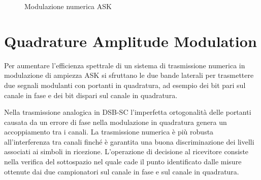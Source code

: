 \begin{figure}[ht]
{	\label{fig:ASK_modulazione}
	}\quad{}
\caption{Modulazione numerica \acf{ASK}}
\end{figure}

\section{Quadrature Amplitude Modulation}
Per aumentare l'efficienza spettrale di un sistema di trasmissione numerica in modulazione di ampiezza \ac{ASK} si sfruttano le due bande laterali per trasmettere due segnali modulanti con portanti in quadratura, ad esempio dei bit pari sul canale in fase e dei bit dispari sul canale in quadratura.

Nella trasmissione analogica in \ac{DSB-SC} l'imperfetta ortogonalità delle portanti causata da un errore di fase nella modulazione in quadratura genera un accoppiamento tra i canali. La trasmissione numerica è più robusta all'interferenza tra canali finché è garantita una buona discriminazione dei livelli associati ai simboli in ricezione. L'operazione di decisione al ricevitore consiste nella verifica del sottospazio nel quale cade il punto identificato dalle misure ottenute dai due campionatori sul canale in fase e sul canale in quadratura.

